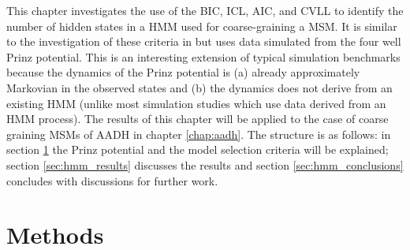 This chapter investigates the use of the BIC, ICL, AIC, and CVLL to identify the number of hidden states in a HMM used for coarse-graining a MSM. It is similar to the investigation of these criteria in \cite{celeuxSelectingHiddenMarkov2008} but uses data simulated from the four well Prinz potential. This is an interesting extension of typical simulation benchmarks because the dynamics of the Prinz potential is (a) already approximately Markovian in the observed states and (b) the dynamics does not derive from an existing HMM (unlike most simulation studies which use data derived from an HMM process). The results of this chapter will be applied to the case of coarse graining MSMs of AADH in chapter \ref{chap:aadh}.  The structure is as follows: in section \ref{sec:hmm_methods} the Prinz potential and the model selection criteria will be explained; section \ref{sec:hmm_results} discusses the results and section \ref{sec:hmm_conclusions} concludes with discussions for further work. 

\section{Methods} \label{sec:hmm_methods}
